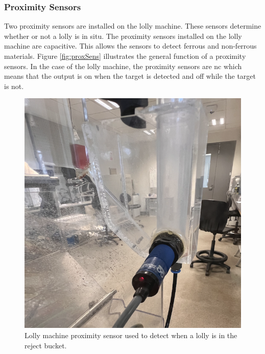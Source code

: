     \subsubsection{Proximity Sensors}
        Two proximity sensors are installed on the lolly machine. These sensors determine whether or not a lolly is in situ. The proximity sensors installed on the lolly machine are capacitive. This allows the sensors to detect ferrous and non-ferrous materials. Figure \ref{fig:proxSens} illustrates the general function of a proximity sensors. In the case of the lolly machine, the proximity sensors are \acrshort{nc} which means that the output is on when the target is detected and off while the target is not.
    \begin{figure}[H]
    \begin{minipage}{0.35\textwidth}
        \centering
            \includegraphics[scale = 0.4]{2_images/rejectProx.png}
            \caption{Lolly machine proximity sensor used to detect when a lolly is in the reject bucket.}
            \label{fig:rejectProx}
    \end{minipage}\hfill
    \begin{minipage}{0.35\textwidth}
        \centering

\end{minipage}
\end{figure}
